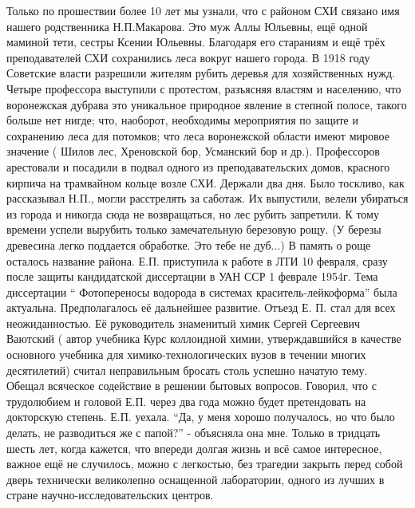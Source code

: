 Только по прошествии более 10 лет мы узнали, что с районом СХИ связано имя нашего родственника Н.П.Макарова. Это муж Аллы Юльевны, ещё одной маминой тети, сестры Ксении Юльевны. Благодаря его стараниям и ещё трёх преподавателей СХИ  сохранились леса вокруг нашего города. В 1918 году Советские власти разрешили жителям рубить деревья для хозяйственных нужд. Четыре профессора выступили с протестом, разъясняя властям и населению, что воронежская дубрава это уникальное природное явление в степной полосе, такого больше нет нигде; что, наоборот, необходимы мероприятия по защите и сохранению леса для потомков; что леса воронежской области имеют мировое значение ( Шилов лес, Хреновской бор, Усманский бор и др.). Профессоров арестовали и посадили в подвал одного из преподавательских домов, красного кирпича на трамвайном кольце возле СХИ. Держали два дня. Было тоскливо, как рассказывал Н.П., могли расстрелять за саботаж. Их выпустили, велели убираться из города и никогда сюда не возвращаться, но лес рубить запретили. К тому времени успели вырубить только замечательную березовую рощу. (У березы древесина легко поддается обработке. Это тебе не дуб...) В память о роще осталось название района.
Е.П. приступила к работе в ЛТИ 10 февраля, сразу после защиты кандидатской диссертации в УАН ССР 1 феврале 1954г. Тема диссертации “ Фотопереносы водорода в системах краситель-лейкоформа” была актуальна. Предполагалось её дальнейшее развитие. Отъезд Е. П. стал для всех неожиданностью. Её руководитель знаменитый химик Сергей Сергеевич Ваютский ( автор учебника Курс коллоидной химии, утверждавшийся в качестве основного учебника для химико-технологических вузов в течении многих десятилетий) считал неправильным бросать столь успешно начатую тему. Обещал всяческое содействие в решении бытовых вопросов. Говорил, что с трудолюбием и головой Е.П. через два года можно будет претендовать на докторскую степень. Е.П. уехала. “Да, у меня хорошо получалось, но что было делать, не разводиться же с папой?” - объясняла она мне. Только в тридцать шесть лет, когда кажется, что впереди долгая жизнь и всё самое интересное, важное ещё не случилось, можно с легкостью, без трагедии закрыть перед собой дверь технически великолепно оснащенной лаборатории, одного из лучших в стране научно-исследовательских центров.


